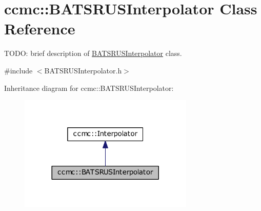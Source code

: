 \hypertarget{classccmc_1_1_b_a_t_s_r_u_s_interpolator}{\section{ccmc\-:\-:B\-A\-T\-S\-R\-U\-S\-Interpolator Class Reference}
\label{classccmc_1_1_b_a_t_s_r_u_s_interpolator}
}


T\-O\-D\-O\-: brief description of \hyperlink{classccmc_1_1_b_a_t_s_r_u_s_interpolator}{B\-A\-T\-S\-R\-U\-S\-Interpolator} class.  




{\ttfamily \#include $<$B\-A\-T\-S\-R\-U\-S\-Interpolator.\-h$>$}



Inheritance diagram for ccmc\-:\-:B\-A\-T\-S\-R\-U\-S\-Interpolator\-:\nopagebreak
\begin{figure}[H]
\begin{center}
\leavevmode
\includegraphics[width=236pt]{classccmc_1_1_b_a_t_s_r_u_s_interpolator__inherit__graph}
\end{center}
\end{figure}


